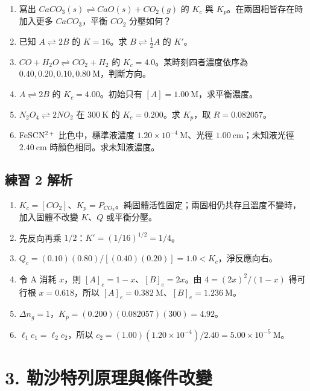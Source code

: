 \documentclass[11pt,a4paper]{article}
\providecommand{\tightlist}{%
  \setlength{\itemsep}{0pt}\setlength{\parskip}{0pt}}
\begin{document}
\begin{enumerate}
\def\labelenumi{\arabic{enumi}.}
\tightlist
\item
  寫出 \(CaCO_3(s)\rightleftharpoons CaO(s)+CO_2(g)\) 的 \(K_c\) 與 \(K_p\)。在兩固相皆存在時加入更多 \(CaCO_3\)，平衡 \(CO_2\) 分壓如何？
\item
  已知 \(A\rightleftharpoons2B\) 的 \(K=16\)。求 \(B\rightleftharpoons\tfrac12A\) 的 \(K'\)。
\item
  \(CO+H_2O\rightleftharpoons CO_2+H_2\) 的 \(K_c=4.0\)。某時刻四者濃度依序為 \(0.40,0.20,0.10,0.80\ \mathrm M\)，判斷方向。
\item
  \(A\rightleftharpoons2B\) 的 \(K_c=4.00\)。初始只有 \([A]=1.00\ \mathrm M\)，求平衡濃度。
\item
  \(N_2O_4\rightleftharpoons2NO_2\) 在 \(300\ \mathrm K\) 的 \(K_c=0.200\)。求 \(K_p\)，取 \(R=0.082057\)。
\item
  FeSCN\(^{2+}\) 比色中，標準液濃度 \(1.20\times10^{-4}\ \mathrm M\)、光徑 \(1.00\ \mathrm{cm}\)；未知液光徑 \(2.40\ \mathrm{cm}\) 時顏色相同。求未知液濃度。
\end{enumerate}

\subsection{練習 2 解析}\label{ux7df4ux7fd2-2-ux89e3ux6790}

\begin{enumerate}
\def\labelenumi{\arabic{enumi}.}
\tightlist
\item
  \(K_c=[CO_2]\)、\(K_p=P_{CO_2}\)。純固體活性固定；兩固相仍共存且溫度不變時，加入固體不改變 \(K\)、\(Q\) 或平衡分壓。
\item
  先反向再乘 \(1/2\)：\(K'=(1/16)^{1/2}=1/4\)。
\item
  \(Q_c=(0.10)(0.80)/[(0.40)(0.20)]=1.0<K_c\)，淨反應向右。
\item
  令 A 消耗 \(x\)，則 \([A]_e=1-x\)、\([B]_e=2x\)。由 \(4=(2x)^2/(1-x)\) 得可行根 \(x=0.618\)，所以 \([A]_e=0.382\ \mathrm M\)、\([B]_e=1.236\ \mathrm M\)。
\item
  \(\Delta n_g=1\)，\(K_p=(0.200)(0.082057)(300)=4.92\)。
\item
  \(\ell_1c_1=\ell_2c_2\)，所以 \(c_2=(1.00)(1.20\times10^{-4})/2.40=5.00\times10^{-5}\ \mathrm M\)。
\end{enumerate}

\section{3. 勒沙特列原理與條件改變}\label{ux52d2ux6c99ux7279ux5217ux539fux7406ux8207ux689dux4ef6ux6539ux8b8a}
\end{document}
